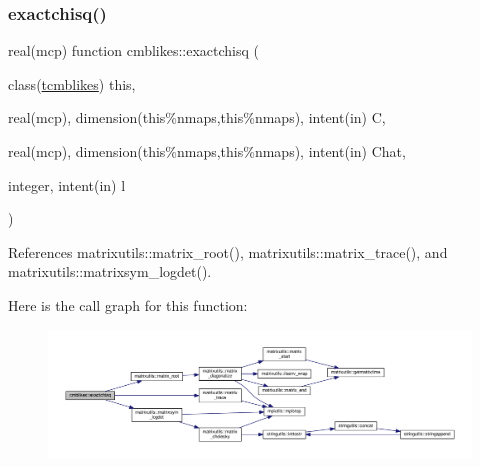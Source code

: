 \mbox{\label{namespacecmblikes_a5ece500a732974850cb05902f8df7f16}} 
\subsubsection{\texorpdfstring{exactchisq()}{exactchisq()}}
{\footnotesize\ttfamily real(mcp) function cmblikes\+::exactchisq (\begin{DoxyParamCaption}\item[{class(\mbox{\hyperlink{structcmblikes_1_1tcmblikes}{tcmblikes}})}]{this,  }\item[{real(mcp), dimension(this\%nmaps,this\%nmaps), intent(in)}]{C,  }\item[{real(mcp), dimension(this\%nmaps,this\%nmaps), intent(in)}]{Chat,  }\item[{integer, intent(in)}]{l }\end{DoxyParamCaption})\hspace{0.3cm}{\ttfamily [private]}}



References matrixutils\+::matrix\+\_\+root(), matrixutils\+::matrix\+\_\+trace(), and matrixutils\+::matrixsym\+\_\+logdet().

Here is the call graph for this function\+:
\nopagebreak
\begin{figure}[H]
\begin{center}
\leavevmode
\includegraphics[width=350pt]{namespacecmblikes_a5ece500a732974850cb05902f8df7f16_cgraph}
\end{center}
\end{figure}
\mbox{\label{namespacecmblikes_aeac358ca50ccdbdddc8f40af418cc6e5}} 
